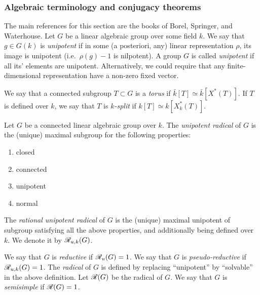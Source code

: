 \subsubsection{Algebraic terminology and conjugacy theorems}

The main references for this section are the books of Borel, Springer, and 
Waterhouse. Let $G$ be a linear algebraic group over some field $k$. We say 
that $g\in G(k)$ is \emph{unipotent} if in some (a posteriori, any) 
linear representation $\rho$, its image is unipotent (i.e.\ 
$\rho(g)-1$ is nilpotent). A group $G$ is called \emph{unipotent} if all 
its' elements are unipotent. Alternatively, we could require that any 
finite-dimensional representation have a non-zero fixed vector. 

We say that a connected subgroup $T\subset G$ is a \emph{torus} if 
$\bar k[T]\simeq \bar k[X^\ast(T)]$. If $T$ is defined over $k$, we say that 
$T$ is \emph{$k$-split} if $k[T]\simeq k[X_k^\ast(T)]$. 

Let $G$ be a connected linear algebraic group over $k$. The \emph{unipotent 
radical} of $G$ is the (unique) maximal subgroup for the following properties:
\begin{enumerate}
  \item closed 
  \item connected 
  \item unipotent
  \item normal 
\end{enumerate}

The \emph{rational unipotent radical} of $G$ is the (unique) 
maximal unipotent of subgroup satisfying all the above properties, and 
additionally being defined over $k$. We denote it by 
$\mathscr{R}_{u,k}(G)$. 

We say that $G$ is \emph{reductive} if $\mathscr{R}_u(G)=1$. We say that $G$ is 
\emph{pseudo-reductive} if $\mathscr{R}_{u,k}(G) = 1$. The \emph{radical} of $G$ 
is defined by replacing ``unipotent'' by ``solvable'' in the above 
definition. Let $\mathscr{R}(G)$ be the radical of $G$. We say that $G$ is 
\emph{semisimple} if $\mathscr{R}(G)=1$. 

